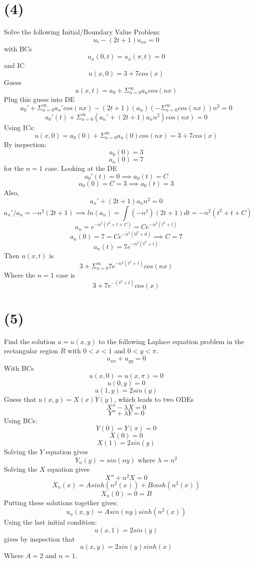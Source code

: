 \documentclass[preview,12pt]{article}
\begin{document}
\section*{(4)}
    Solve the following Initial/Boundary Value Problem:
    $$u_t-(2t+1)u_{xx}=0$$
    with BCs
    $$u_x(0,t)=u_x(\pi,t)=0$$
    and IC
    $$u(x,0)=3+7cos(x)$$
    Guess
    $$u(x,t)=a_0+\Sigma_{n=0}^\infty a_ncos(nx)$$
    Plug this guess into DE
    $$a_0'+\Sigma_{n=0}^\infty a_n'cos(nx)-(2t+1)(a_n)(-\Sigma_{n=0}^\infty cos(nx))n^2=0$$
    $$a_0'(t)+\Sigma_{n=0}^\infty (a_n'+(2t+1)a_nn^2)cos(nx)=0$$
    Using ICs:
    $$u(x,0)=a_0(0)+\Sigma_{n=0}^\infty a_n(0)cos(nx)=3+7cos(x)$$
    By inspection:
    $$a_0(0)=3$$
    $$a_n(0)=7$$
    for the $n=1$ case. \newline
    Looking at the DE
    $$a_0'(t)=0 \implies a_0(t)=C$$
    $$a_0(0)=C=3 \implies a_0(t)=3$$
    Also,
    $$a_n'+(2t+1)a_nn^2=0$$
    $$a_n'/a_n=-n^2(2t+1)\implies ln(a_n)=\int(-n^2)(2t+1)dt=-n^2(t^2+t+C)$$
    $$a_n=e^{-n^2(t^2+t+C)}=Ce^{-n^2(t^2+t)}$$
    $$a_n(0)=7=Ce^{-n^2(0^2+0)} \implies C=7$$
    $$a_n(t)=7e^{-n^2(t^2+t)}$$
    Then $u(x,t)$ is
    $$3+\Sigma_{n=0}^\infty 7e^{-n^2(t^2+t)}cos(nx)$$
    Where the $n=1$ case is 
    $$3+7e^{-(t^2+t)}cos(x)$$
    
\section*{(5)}
    Find the solution $u=u(x,y)$ to the following Laplace equation problem in the rectangular region $R$ with $0<x<1$ and $0<y<\pi$.
    $$u_{xx}+u_{yy}=0$$
    With BCs
    $$u(x,0)=u(x,\pi)=0$$
    $$u(0,y)=0$$
    $$u(1,y)=2sin(y)$$
    Guess that $u(x,y)=X(x)Y(y)$, which leads to two ODEs
    $$X''-\lambda X=0$$
    $$Y''+\lambda Y=0$$
    Using BCs:
    $$Y(0)=Y(\pi)=0$$
    $$X(0)=0$$
    $$X(1)=2sin(y)$$
    Solving the $Y$ equation gives
    $$Y_n(y)=sin(ny) \textrm{ where } \lambda=n^2$$
    Solving the $X$ equation gives
    $$X''+n^2X=0$$
    $$X_n(x)=Asinh(n^2(x))+Bcosh(n^2(x))$$
    $$X_n(0)=0=B$$
    Putting these solutions together gives:
    $$u_n(x,y)=Asin(ny)sinh(n^2(x))$$
    Using the last initial condition:
    $$u(x,1)=2sin(y)$$
    gives by inspection that
    $$\boxed{u(x,y)=2sin(y)sinh(x)}$$
    Where $A=2$ and $n=1$.
    
\end{document}
